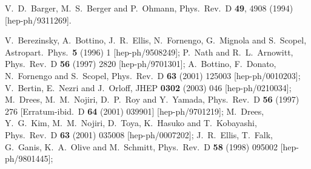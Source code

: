 \documentclass[final,3p,11pt,pdflatex]{elsarticle}
\begin{document}
\begin{thebibliography}{100}
  V.~D.~Barger, M.~S.~Berger and P.~Ohmann,
  Phys.\ Rev.\ D {\bf 49}, 4908 (1994)
  [hep-ph/9311269].

  V.~Berezinsky, A.~Bottino, J.~R.~Ellis, N.~Fornengo, G.~Mignola and S.~Scopel,
  Astropart.\ Phys.\  {\bf 5} (1996) 1
  [hep-ph/9508249];
  P.~Nath and R.~L.~Arnowitt,
  Phys.\ Rev.\ D {\bf 56} (1997) 2820
  [hep-ph/9701301];
  A.~Bottino, F.~Donato, N.~Fornengo and S.~Scopel,
  Phys.\ Rev.\ D {\bf 63} (2001) 125003
  [hep-ph/0010203];
  V.~Bertin, E.~Nezri and J.~Orloff,
  JHEP {\bf 0302} (2003) 046
  [hep-ph/0210034];
%
  M.~Drees, M.~M.~Nojiri, D.~P.~Roy and Y.~Yamada,
  Phys.\ Rev.\ D {\bf 56} (1997) 276
   [Erratum-ibid.\ D {\bf 64} (2001) 039901]
  [hep-ph/9701219];
  M.~Drees, Y.~G.~Kim, M.~M.~Nojiri, D.~Toya, K.~Hasuko and T.~Kobayashi,
  Phys.\ Rev.\ D {\bf 63} (2001) 035008
  [hep-ph/0007202];
%
  J.~R.~Ellis, T.~Falk, G.~Ganis, K.~A.~Olive and M.~Schmitt,
  Phys.\ Rev.\ D {\bf 58} (1998) 095002
  [hep-ph/9801445];

\end{thebibliography}
\end{document}

